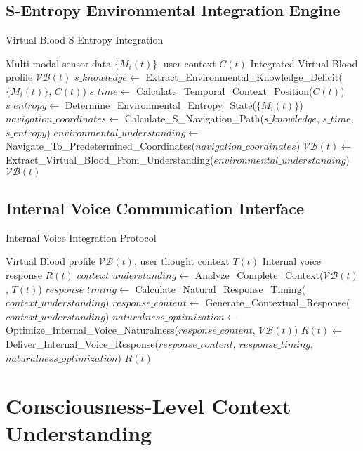 \documentclass[12pt,a4paper]{article}
\begin{document}
\subsection{S-Entropy Environmental Integration Engine}

\begin{algorithm}
\caption{Virtual Blood S-Entropy Integration}
\begin{algorithmic}[1]
\REQUIRE Multi-modal sensor data $\{M_i(t)\}$, user context $C(t)$
\ENSURE Integrated Virtual Blood profile $\mathcal{VB}(t)$
\STATE $s\_knowledge \leftarrow$ Extract\_Environmental\_Knowledge\_Deficit($\{M_i(t)\}$, $C(t)$)
\STATE $s\_time \leftarrow$ Calculate\_Temporal\_Context\_Position($C(t)$)
\STATE $s\_entropy \leftarrow$ Determine\_Environmental\_Entropy\_State($\{M_i(t)\}$)
\STATE $navigation\_coordinates \leftarrow$ Calculate\_S\_Navigation\_Path($s\_knowledge$, $s\_time$, $s\_entropy$)
\STATE $environmental\_understanding \leftarrow$ Navigate\_To\_Predetermined\_Coordinates($navigation\_coordinates$)
\STATE $\mathcal{VB}(t) \leftarrow$ Extract\_Virtual\_Blood\_From\_Understanding($environmental\_understanding$)
\RETURN $\mathcal{VB}(t)$
\end{algorithmic}
\end{algorithm}

\subsection{Internal Voice Communication Interface}

\begin{algorithm}
\caption{Internal Voice Integration Protocol}
\begin{algorithmic}[1]
\REQUIRE Virtual Blood profile $\mathcal{VB}(t)$, user thought context $T(t)$
\ENSURE Internal voice response $R(t)$
\STATE $context\_understanding \leftarrow$ Analyze\_Complete\_Context($\mathcal{VB}(t)$, $T(t)$)
\STATE $response\_timing \leftarrow$ Calculate\_Natural\_Response\_Timing($context\_understanding$)
\STATE $response\_content \leftarrow$ Generate\_Contextual\_Response($context\_understanding$)
\STATE $naturalness\_optimization \leftarrow$ Optimize\_Internal\_Voice\_Naturalness($response\_content$, $\mathcal{VB}(t)$)
\STATE $R(t) \leftarrow$ Deliver\_Internal\_Voice\_Response($response\_content$, $response\_timing$, $naturalness\_optimization$)
\RETURN $R(t)$
\end{algorithmic}
\end{algorithm}

\section{Consciousness-Level Context Understanding}
\end{document}
